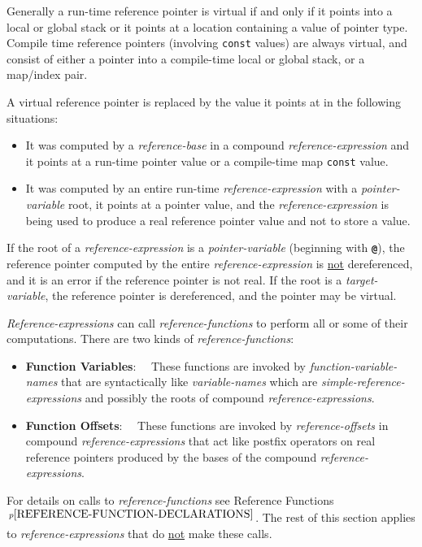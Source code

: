 \documentclass[12pt]{article}
\newcommand{\TT}[1]{{\tt \bfseries #1}}
\newcommand{\key}[1]{{\rm \bfseries #1}}
\newcommand{\pagnote}[1]{$\,^{p\pageref{#1}}$}
\begin{document}
Generally a run-time reference pointer
is virtual if and only if it points into a
local or global stack or it points at a location containing a value of
pointer type.
Compile time reference pointers (involving {\tt const} values) are always
virtual, and consist of either a pointer into a compile-time local or
global stack, or a map/index pair.


A virtual reference pointer is replaced by the value it points at in
the following situations:
\begin{itemize}
\item It was computed by a {\em reference-base} in a compound
{\em reference-expression} and it points at
a run-time pointer value or a compile-time map {\tt const} value.
\item It was computed by an entire run-time {\em reference-expression}
with a {\em pointer-variable} root, it points at a pointer value, and
the {\em reference-expression} is being used to produce a real reference
pointer value and not to store a value.
\end{itemize}

If the root of a {\em reference-expression} is a {\em pointer-variable}
(beginning with \TT{@}), the reference pointer computed by the entire
{\em reference-expression} is \underline{not}
dereferenced, and it is an error if the reference pointer is not real.
If the root is a {\em target-variable}, the reference
pointer is dereferenced, and the pointer may be virtual.

{\em Reference-expressions} can call {\em reference-functions} to perform
all or some of their computations.  There are two kinds of
{\em reference-functions}:
\begin{itemize}
\item\key{Function Variables}:~~
These functions
are invoked by {\em function-variable-names} that are syntactically
like {\em variable-names} which are {\em simple-reference-expressions} and
possibly the roots of compound {\em reference-expressions}.
\item\key{Function Offsets}:~~
These functions are invoked by {\em reference-offsets} in
compound {\em reference-expressions}
that act like postfix operators on
real reference pointers produced by the bases of the
compound {\em reference-expressions}.
\end{itemize}

For details on calls to {\em reference-functions}
see Reference Functions\pagnote{REFERENCE-FUNCTION-DECLARATIONS}.
The rest of this section applies to {\em reference-expressions}
that do \underline{not} make these calls.
\end{document}
